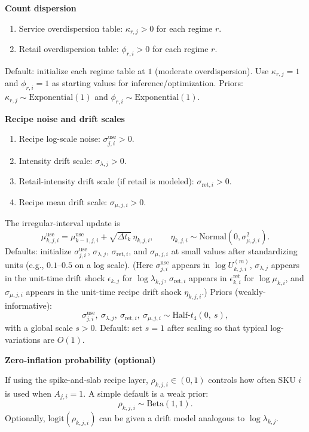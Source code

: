 \documentclass[11pt]{article}
\begin{document}
\textbf{Count dispersion}
\begin{enumerate}
  \item Service overdispersion table: $\kappa_{r,j} > 0$ for each regime $r$.
  \item Retail overdispersion table: $\phi_{r,i} > 0$ for each regime $r$.
\end{enumerate}
Default: initialize each regime table at $1$ (moderate overdispersion).
Use $\kappa_{r,j}=1$ and $\phi_{r,i}=1$ as starting values for inference/optimization.
Priors: $\kappa_{r,j} \sim \text{Exponential}(1)$ and $\phi_{r,i} \sim \text{Exponential}(1)$.

\textbf{Recipe noise and drift scales}
\begin{enumerate}
  \item Recipe log-scale noise: $\sigma^{\mathrm{use}}_{j,i} > 0$.
  \item Intensity drift scale: $\sigma_{\lambda,j} > 0$.
  \item Retail-intensity drift scale (if retail is modeled): $\sigma_{\mathrm{ret},i} > 0$.
  \item Recipe mean drift scale: $\sigma_{\mu,j,i} > 0$.
\end{enumerate}
The irregular-interval update is
\[
  \mu^{\mathrm{use}}_{k,j,i}=\mu^{\mathrm{use}}_{k-1,j,i}+\sqrt{\Delta t_k}\,\eta_{k,j,i},
  \qquad \eta_{k,j,i}\sim\text{Normal}(0,\sigma^2_{\mu,j,i}).
\]
Defaults: initialize $\sigma^{\mathrm{use}}_{j,i}$, $\sigma_{\lambda,j}$, $\sigma_{\mathrm{ret},i}$, and $\sigma_{\mu,j,i}$ at small values after standardizing units (e.g., $0.1$--$0.5$ on a log scale).
(Here $\sigma^{\mathrm{use}}_{j,i}$ appears in $\log U^{(m)}_{k,j,i}$, $\sigma_{\lambda,j}$ appears in the unit-time drift shock $\epsilon_{k,j}$ for $\log\lambda_{k,j}$, $\sigma_{\mathrm{ret},i}$ appears in $\epsilon^{\mathrm{ret}}_{k,i}$ for $\log\mu_{k,i}$, and $\sigma_{\mu,j,i}$ appears in the unit-time recipe drift shock $\eta_{k,j,i}$.)
Priors (weakly-informative):
\[
  \sigma^{\mathrm{use}}_{j,i},\ \sigma_{\lambda,j},\ \sigma_{\mathrm{ret},i},\ \sigma_{\mu,j,i} \sim \text{Half-}t_{4}(0,\ s),
\]
with a global scale $s>0$.
Default: set $s=1$ after scaling so that typical log-variations are $O(1)$.

\textbf{Zero-inflation probability (optional)}

If using the spike-and-slab recipe layer, $\rho_{k,j,i} \in (0,1)$ controls how often SKU $i$ is used when $A_{j,i}=1$.
A simple default is a weak prior:
\[
  \rho_{k,j,i} \sim \text{Beta}(1,1).
\]
Optionally, $\text{logit}(\rho_{k,j,i})$ can be given a drift model analogous to $\log \lambda_{k,j}$.
\end{document}
